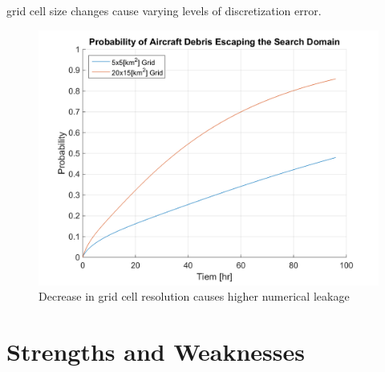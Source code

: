 \documentclass[12pt, letterpaper]{article}  %
\theoremstyle{definition}
\theoremstyle{remark}
\theoremstyle{plain}
\begin{document}

grid cell size changes cause varying levels of discretization error.

\begin{center}
	\begin{figure}[H]
		\centering
		\includegraphics[width=0.8\linewidth]{simulation/NoSearchEscapeExplain}
		\caption{Decrease in grid cell resolution causes higher numerical leakage}
		\label{fig:NoSearchEscapeExplain}
	\end{figure}
\end{center}



\section{Strengths and Weaknesses}\label{sec:sandw}
\end{document}
